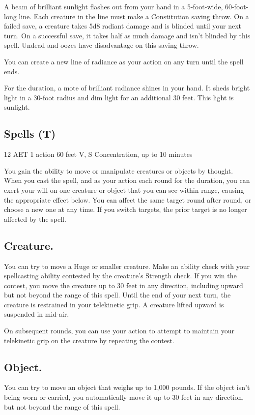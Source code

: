A beam of brilliant sunlight flashes out from your hand in a 5-foot-wide, 60-foot-long line. Each creature in the line must make a Constitution saving throw. On a failed save, a creature takes 5d8 radiant damage and is blinded until your next turn. On a successful save, it takes half as much damage and isn't blinded by this spell. Undead and oozes have disadvantage on this saving throw.

You can create a new line of radiance as your action on any turn until the spell ends.

For the duration, a mote of brilliant radiance shines in your hand. It sheds bright light in a 30-foot radius and dim light for an additional 30 feet. This light is sunlight.

\subsection{Spells (T)}


{12 AET}
{1 action}
{60 feet}
{V, S}
{Concentration, up to 10 minutes}

You gain the ability to move or manipulate creatures or objects by thought. When you cast the spell, and as your action each round for the duration, you can exert your will on one creature or object that you can see within range, causing the appropriate effect below. You can affect the same target round after round, or choose a new one at any time. If you switch targets, the prior target is no longer affected by the spell.

\subsection*{Creature.} You can try to move a Huge or smaller creature. Make an ability check with your spellcasting ability contested by the creature's Strength check. If you win the contest, you move the creature up to 30 feet in any direction, including upward but not beyond the range of this spell. Until the end of your next turn, the creature is restrained in your telekinetic grip. A creature lifted upward is suspended in mid-air.

On subsequent rounds, you can use your action to attempt to maintain your telekinetic grip on the creature by repeating the contest.

\subsection*{Object.} You can try to move an object that weighs up to 1,000 pounds. If the object isn't being worn or carried, you automatically move it up to 30 feet in any direction, but not beyond the range of this spell.

